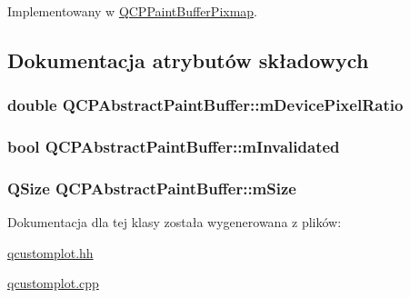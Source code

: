 Implementowany w \hyperlink{class_q_c_p_paint_buffer_pixmap_a357964ef7d28cfa530338be4e5c93234}{Q\+C\+P\+Paint\+Buffer\+Pixmap}.



\subsection{Dokumentacja atrybutów składowych}
\subsubsection[{\texorpdfstring{m\+Device\+Pixel\+Ratio}{mDevicePixelRatio}}]{\setlength{\rightskip}{0pt plus 5cm}double Q\+C\+P\+Abstract\+Paint\+Buffer\+::m\+Device\+Pixel\+Ratio\hspace{0.3cm}{\ttfamily [protected]}}\hypertarget{class_q_c_p_abstract_paint_buffer_a33c1fd784478441fcff9ebf3d69af5b2}{}\label{class_q_c_p_abstract_paint_buffer_a33c1fd784478441fcff9ebf3d69af5b2}
\subsubsection[{\texorpdfstring{m\+Invalidated}{mInvalidated}}]{\setlength{\rightskip}{0pt plus 5cm}bool Q\+C\+P\+Abstract\+Paint\+Buffer\+::m\+Invalidated\hspace{0.3cm}{\ttfamily [protected]}}\hypertarget{class_q_c_p_abstract_paint_buffer_a3bc49cc9cf9daaca3a60977f010c08c9}{}\label{class_q_c_p_abstract_paint_buffer_a3bc49cc9cf9daaca3a60977f010c08c9}
\subsubsection[{\texorpdfstring{m\+Size}{mSize}}]{\setlength{\rightskip}{0pt plus 5cm}Q\+Size Q\+C\+P\+Abstract\+Paint\+Buffer\+::m\+Size\hspace{0.3cm}{\ttfamily [protected]}}\hypertarget{class_q_c_p_abstract_paint_buffer_ae246c426222bfa18d5e8797fab73e3ce}{}\label{class_q_c_p_abstract_paint_buffer_ae246c426222bfa18d5e8797fab73e3ce}


Dokumentacja dla tej klasy została wygenerowana z plików\+:\begin{DoxyCompactItemize}
\item 
\hyperlink{qcustomplot_8hh}{qcustomplot.\+hh}\item 
\hyperlink{qcustomplot_8cpp}{qcustomplot.\+cpp}\end{DoxyCompactItemize}
